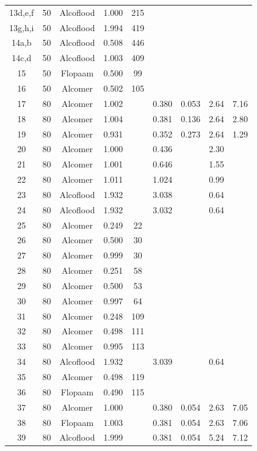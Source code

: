 \begin{appendices}
\begin{center}
\begin{longtable}{|c|c|c|c|c|c|c|c|c|}
13d,e,f	&	50	&	Alcoflood	&	1.000	&	215	&		&		&		&		\\
13g,h,i	&	50	&	Alcoflood	&	1.994	&	419	&		&		&		&		\\
14a,b	&	50	&	Alcoflood	&	0.508	&	446	&		&		&		&		\\
14c,d	&	50	&	Alcoflood	&	1.003	&	409	&		&		&		&		\\
15	&	50	&	Flopaam 	&	0.500	&	99	&		&		&		&		\\
16	&	50	&	Alcomer	&	0.502	&	105	&		&		&		&		\\
17	&	80	&	Alcomer	&	1.002	&		&	0.380	&	0.053	&	2.64	&	7.16	\\
18	&	80	&	Alcomer	&	1.004	&		&	0.381	&	0.136	&	2.64	&	2.80	\\
19	&	80	&	Alcomer	&	0.931	&		&	0.352	&	0.273	&	2.64	&	1.29	\\
20	&	80	&	Alcomer	&	1.000	&		&	0.436	&		&	2.30	&		\\
21	&	80	&	Alcomer	&	1.001	&		&	0.646	&		&	1.55	&		\\
22	&	80	&	Alcomer	&	1.011	&		&	1.024	&		&	0.99	&		\\
23	&	80	&	Alcoflood	&	1.932	&		&	3.038	&		&	0.64	&		\\
24	&	80	&	Alcoflood	&	1.932	&		&	3.032	&		&	0.64	&		\\
25	&	80	&	Alcomer	&	0.249	&	22	&		&		&		&		\\
26	&	80	&	Alcomer	&	0.500	&	30	&		&		&		&		\\
27	&	80	&	Alcomer	&	0.999	&	30	&		&		&		&		\\
28	&	80	&	Alcomer	&	0.251	&	58	&		&		&		&		\\
29	&	80	&	Alcomer	&	0.500	&	53	&		&		&		&		\\
30	&	80	&	Alcomer	&	0.997	&	64	&		&		&		&		\\
31	&	80	&	Alcomer	&	0.248	&	109	&		&		&		&		\\
32	&	80	&	Alcomer	&	0.498	&	111	&		&		&		&		\\
33	&	80	&	Alcomer	&	0.995	&	113	&		&		&		&		\\
34	&	80	&	Alcoflood	&	1.932	&		&	3.039	&		&	0.64	&		\\
35	&	80	&	Alcomer	&	0.498	&	119	&		&		&		&		\\
36	&	80	&	Flopaam 	&	0.490	&	115	&		&		&		&		\\
37	&	80	&	Alcomer	&	1.000	&		&	0.380	&	0.054	&	2.63	&	7.05	\\
38	&	80	&	Flopaam 	&	1.003	&		&	0.381	&	0.054	&	2.63	&	7.06	\\
39	&	80	&	Alcoflood	&	1.999	&		&	0.381	&	0.054	&	5.24	&	7.12	\\

\end{longtable}
\end{center}
\end{appendices}
